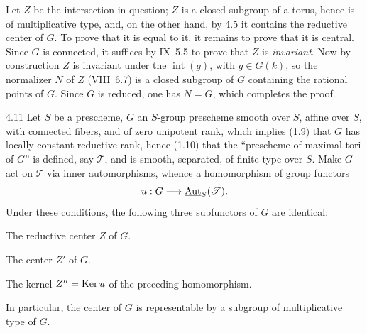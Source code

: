 Let $Z$ be the intersection in question; $Z$ is a closed subgroup of a torus, hence is of multiplicative type, and, on the other hand, by 4.5 it contains the reductive center of $G$. To prove that it is equal to it, it remains to prove that it is central. Since $G$ is connected, it suffices by IX~5.5 to prove that $Z$ is \emph{invariant}. Now by construction $Z$ is invariant under the $\operatorname{int}(g)$, with $g\in G(k)$, so the normalizer $N$ of $Z$ (\cf VIII~6.7) is a closed subgroup of $G$ containing the rational points of $G$. Since $G$ is reduced, one has $N=G$, which completes the proof.
\begin{proposition}{4.11}\label{XII.4.11}
Let $S$ be a prescheme, $G$ an $S$-group prescheme smooth over $S$, affine over $S$, with connected fibers, and of zero unipotent rank, which implies (1.9) that $G$ has locally constant reductive rank, hence (1.10) that the ``prescheme of maximal tori of $G$'' is defined, say $\mathscr T$, and is smooth, separated, of finite type over $S$.
Make $G$ act on $\mathscr T$ via inner automorphisms, whence a homomorphism of group functors
\[
u:G\longrightarrow\underline{\operatorname{Aut}}_S(\mathscr T).
\]
Under these conditions, the following three subfunctors of $G$ are identical:
\begin{enumeratei}
\item The reductive center $Z$ of $G$.
\item The center $Z'$ of $G$.
\item The kernel $Z''=\operatorname{Ker} u$ of the preceding homomorphism.
\end{enumeratei}
In particular, the center of $G$ is representable by a subgroup of multiplicative type of $G$.
\end{proposition}
